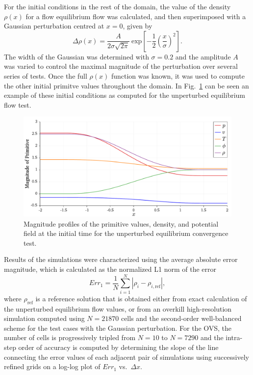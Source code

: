 For the initial conditions in the rest of the domain, the value of the density $\rho(x)$ for a flow equilibrium flow was calculated, and then superimposed with a Gaussian perturbation centred at $x=0$, given by
\begin{equation}
\Delta \rho(x)=\frac{A}{2\sigma \sqrt{2 \pi}}\ \textrm{exp}\left[-\frac{1}{2}\left(\frac{x}{\sigma}\right)^2\right].
\end{equation}
The width of the Gaussian was determined with $\sigma=0.2$ and the amplitude $A$ was varied to control the maximal magnitude of the perturbation over several series of tests. Once the full $\rho(x)$ function was known, it was used to compute the other initial primitve values throughout the domain. In Fig.~\ref{fig:OVS_initial_profile} can be seen an example of these initial conditions as computed for the unperturbed equilibrium flow test.

\begin {figure}
\centering
\includegraphics[width=13cm]{figures/OVS_initial_profile}
\caption {Magnitude profiles of the primitive values, density, and potential field at the initial time for the unperturbed equilibrium convergence test.}
\label{fig:OVS_initial_profile}
\end{figure}

Results of the simulations were characterized using the average absolute error magnitude, which is calculated as the normalized L1 norm of the error
\begin{equation}
Err_1=\frac{1}{N}\sum\limits_{i=1}^N \left|\rho_i-\rho_{i,\textrm{ref}}\right|,
\end{equation}
where $\rho_{\textrm{ref}}$ is a reference solution that is obtained either from exact calculation of the unperturbed equilibrium flow values, or from an overkill high-resolution simulation computed using $N=21870$ cells and the second-order well-balanced scheme for the test cases with the Gaussian perturbation. For the OVS, the number of cells is progressively tripled from $N=10$ to $N=7290$ and the intra-step order of accuracy is computed by determining the slope of the line connecting the error values of each adjacent pair of simulations using successively refined grids on a log-log plot of $Err_1$ vs.\ $\Delta x$.

